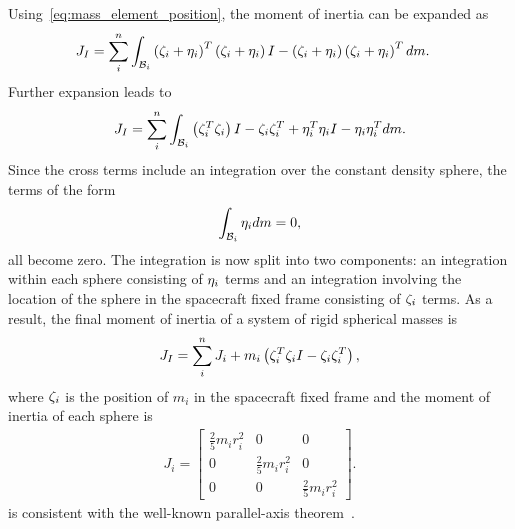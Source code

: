 Using~\cref{eq:mass_element_position}, the moment of inertia can be expanded as
\begin{align*}
    J_I &= \sum_i^n \int_{\mathcal{B}_i} \left( \zeta_i + \eta_i \right)^T \left( \zeta_i + \eta_i  \right) I  - \left( \zeta_i + \eta_i \right) \left( \zeta_i + \eta_i \right)^T dm .
\end{align*}
Further expansion leads to
\begin{align*}
    J_I = \sum_i^n \int_{\mathcal{B}_i} \left( \zeta_i^T \zeta_i \right)I - \zeta_i \zeta_i^T + \eta_i^T \eta_i I - \eta_i \eta_i^T dm.
\end{align*}
Since the cross terms include an integration over the constant density sphere, the terms of the form
\begin{align*}
    \int_{\mathcal{B}_i} \eta_i dm = 0,
\end{align*}
all become zero.
The integration is now split into two components: an integration within each sphere consisting of \( \eta_i \) terms and an integration involving the location of the sphere in the spacecraft fixed frame consisting of \( \zeta_i \) terms.
As a result, the final moment of inertia of a system of rigid spherical masses is 
\begin{align}\label{eq:dumbbell_moment_of_inertia}
    J_I = \sum_i^n J_i + m_i \left( \zeta_i^T \zeta_i I - \zeta_i \zeta_i^T \right) , 
\end{align}
where \( \zeta_i \) is the position of \( m_i \) in the spacecraft fixed frame and the moment of inertia of each sphere is
\begin{align}\label{eq:sphere_moment_of_inertia}
    J_i = \begin{bmatrix} 
        \frac{2}{5} m_i r_i^2 & 0 & 0 \\
        0 & \frac{2}{5} m_i r_i^2 & 0 \\
        0 & 0 & \frac{2}{5} m_i r_i^2 
    \end{bmatrix}.
\end{align}
 is consistent with the well-known parallel-axis theorem~\cite{greenwood1988}.

